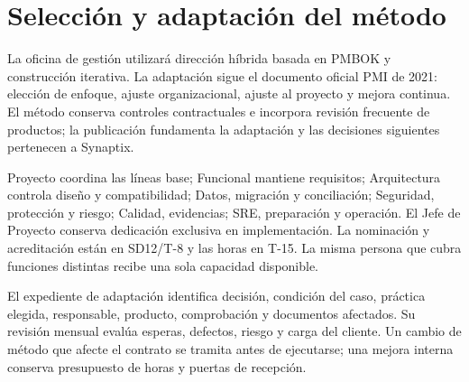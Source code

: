 \section{Selección y adaptación del método}
La oficina de gestión utilizará dirección híbrida basada en PMBOK y construcción iterativa. La adaptación sigue el documento oficial PMI de 2021: elección de enfoque, ajuste organizacional, ajuste al proyecto y mejora continua. El método conserva controles contractuales e incorpora revisión frecuente de productos; la publicación fundamenta la adaptación y las decisiones siguientes pertenecen a Synaptix. \parencite[pp.~1--7]{sd6-pmi-adaptacion}

Proyecto coordina las líneas base; Funcional mantiene requisitos; Arquitectura controla diseño y compatibilidad; Datos, migración y conciliación; Seguridad, protección y riesgo; Calidad, evidencias; SRE, preparación y operación. El Jefe de Proyecto conserva dedicación exclusiva en implementación. La nominación y acreditación están en SD12/T-8 y las horas en T-15. La misma persona que cubra funciones distintas recibe una sola capacidad disponible. \parencite[cap.~19, pp.~33--34]{sd6-bt}

El expediente de adaptación identifica decisión, condición del caso, práctica elegida, responsable, producto, comprobación y documentos afectados. Su revisión mensual evalúa esperas, defectos, riesgo y carga del cliente. Un cambio de método que afecte el contrato se tramita antes de ejecutarse; una mejora interna conserva presupuesto de horas y puertas de recepción.

